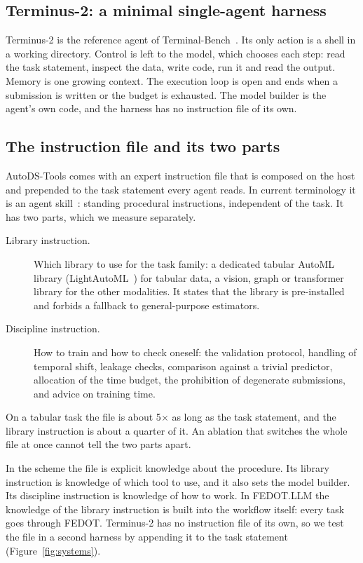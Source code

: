 \subsection{Terminus-2: a minimal single-agent harness}

Terminus-2 is the reference agent of
Terminal-Bench~\citep{merrill2026terminalbench}. Its only action is a shell
in a working directory. Control is left to the model, which chooses each
step: read the task statement, inspect the data, write code, run it and read
the output. Memory is one growing context. The execution loop is open and
ends when a submission is written or the budget is exhausted. The model
builder is the agent's own code, and the harness has no instruction file of
its own.

\subsection{The instruction file and its two parts}
\label{sec:file}

AutoDS-Tools comes with an expert instruction file that is composed on the
host and prepended to the task statement every agent reads. In current
terminology it is an agent skill~\citep{li2026skillsbench}: standing
procedural instructions, independent of the task. It has two parts, which
we measure separately.
\begin{description}
  \item[Library instruction.] Which library to use for the task family: a
        dedicated tabular AutoML library (LightAutoML~\citep{vakhrushev2021lightautoml})
        for tabular data, a vision, graph or transformer library for the other
        modalities. It states that the library is pre-installed and forbids a
        fallback to general-purpose estimators.
  \item[Discipline instruction.] How to train and how to check oneself:
        the validation protocol, handling of temporal shift, leakage checks,
        comparison against a trivial predictor, allocation of the time budget,
        the prohibition of degenerate submissions, and advice on training
        time.
\end{description}
On a tabular task the file is about 5$\times$ as long as the task statement,
and the library instruction is about a quarter of it. An ablation that
switches the whole file at once cannot tell the two parts apart.

In the scheme the file is explicit knowledge about the procedure. Its
library instruction is knowledge of which tool to use, and it also sets the
model builder. Its discipline instruction is knowledge of how to work. In
FEDOT.LLM the knowledge of the library instruction is built into the
workflow itself: every task goes through FEDOT.
Terminus-2 has no instruction file of its own, so we test the file in a
second harness by appending it to the task statement
(Figure~\ref{fig:systems}).
